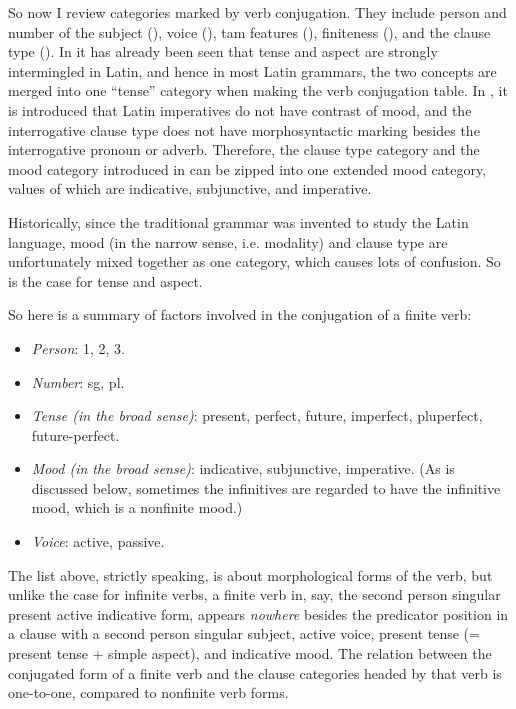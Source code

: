 \documentclass{article}
\begin{document}
So now I review categories marked by verb conjugation.
They include person and number of the subject (),
voice (), 
\ac{tam} features (), 
finiteness (), 
and the clause type ().
In  it has already been seen that tense and aspect are strongly intermingled in Latin,
and hence in most Latin grammars, the two concepts are merged into one ``tense'' category 
when making the verb conjugation table.
In , it is introduced that Latin imperatives do not have contrast of mood,
and the interrogative clause type does not have morphosyntactic marking 
besides the interrogative pronoun or adverb.
Therefore, the clause type category and the mood category introduced in  
can be zipped into one extended mood category,
values of which are indicative, subjunctive, and imperative.

Historically, since the traditional grammar was invented to study the Latin language,
mood (in the narrow sense, i.e. modality) and clause type 
are unfortunately mixed together as one category, which causes lots of confusion.
So is the case for tense and aspect.

So here is a summary of factors involved in the conjugation of a finite verb:
\begin{itemize}
    \item \emph{Person}: 1, 2, 3.
    \item \emph{Number}: sg, pl.
    \item \emph{Tense (in the broad sense)}: present, perfect, future, imperfect, pluperfect, future-perfect.
    \item \emph{Mood (in the broad sense)}: indicative, subjunctive, imperative. 
    (As is discussed below, sometimes the infinitives are regarded to have the infinitive mood,
    which is a nonfinite mood.)
    \item \emph{Voice}: active, passive.
\end{itemize}

The list above, strictly speaking, is about morphological forms of the verb,
but unlike the case for infinite verbs,
a finite verb in, say, the second person singular present active indicative form,
appears \emph{nowhere} besides the predicator position 
in a clause with a second person singular subject,
active voice,
present tense (= present tense + simple aspect),
and indicative mood.
The relation between the conjugated form of a finite verb and the clause categories headed by that verb 
is one-to-one, compared to nonfinite verb forms.
\end{document}
